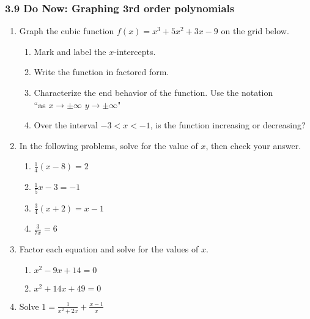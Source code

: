 \documentclass[12pt, twoside]{article}
\begin{document}
\subsubsection*{3.9 Do Now: Graphing 3rd order polynomials}
\begin{enumerate}
\item Graph the cubic function $f(x) = x^{3}+5x^{2}+3x-9$ on the grid below. 
  \begin{enumerate}
      \item Mark and label the $x$-intercepts. 
      \item Write the function in factored form. \vspace{1.5cm}
      \item Characterize the end behavior of the function. Use the notation \\
      ``as $x \rightarrow \pm \infty$ $y \rightarrow\pm \infty$"    
      \item Over the interval $-3<x<-1$, is the function increasing or decreasing? 
  \end{enumerate} \hspace{2cm}
  
    \begin{center}
    \end{center}

\newpage
\item In the following problems, solve for the value of $x$, then check your answer.
\begin{multicols}{2}
  \begin{enumerate}[itemsep=3cm]
    \item $\frac{1}{4}(x - 8) = 2$
    \item $\frac{1}{5} x - 3 = -1$
    \item $\frac{3}{4}(x + 2) = x - 1$
    \item $\displaystyle \frac{3}{7x} = 6$
    \end{enumerate}
    \end{multicols} \vspace{4cm}

\item Factor each equation and solve for the values of $x$.
  \begin{multicols}{2}
    \begin{enumerate}[itemsep=5cm]
    \item $x^2-9x+14=0$
    \item $x^2+14x+49=0$
  \end{enumerate}
  \end{multicols} \vspace{4cm}

\item Solve $\displaystyle 1 = \frac{1}{x^2+2x} + \frac{x-1}{x}$ 

\end{enumerate}
\end{document}
